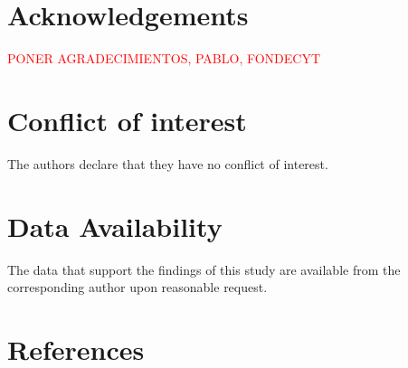 \documentclass[%
  aip,
  pof,          %
  reprint,      %
  floatfix
]{revtex4-2}
\begin{document}
\section*{Acknowledgements}

\textcolor{red}{PONER AGRADECIMIENTOS, PABLO, FONDECYT}

\section*{Conflict of interest}

The authors declare that they have no conflict of interest.

\section*{Data Availability}

The data that support the findings of this study are available from the corresponding author upon reasonable request.


\section*{References}

\end{document}

